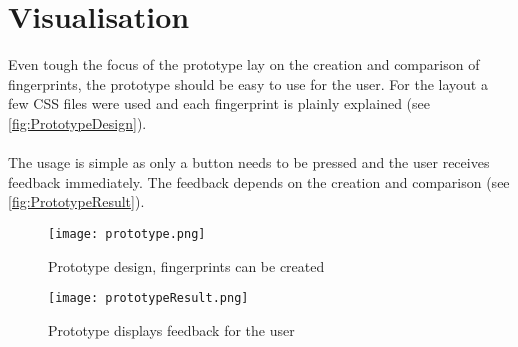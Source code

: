 \section{Visualisation}

Even tough the focus of the prototype lay on the creation and comparison of fingerprints, the prototype should be easy to use for the user. For the layout a few CSS files were used and each fingerprint is plainly explained (see \autoref{fig:PrototypeDesign}).\\\\
The usage is simple as only a button needs to be pressed and the user receives feedback immediately. The feedback depends on the creation and comparison (see \autoref{fig:PrototypeResult}).

\begin{figure}[H]
	\centering
	\texttt{[image: prototype.png]}
	\caption{Prototype design, fingerprints can be created\\}
	\label{fig:PrototypeDesign}
\end{figure}

\begin{figure}[H]
	\centering
	\texttt{[image: prototypeResult.png]}
	\caption{Prototype displays feedback for the user\\}
	\label{fig:PrototypeResult}
\end{figure}

